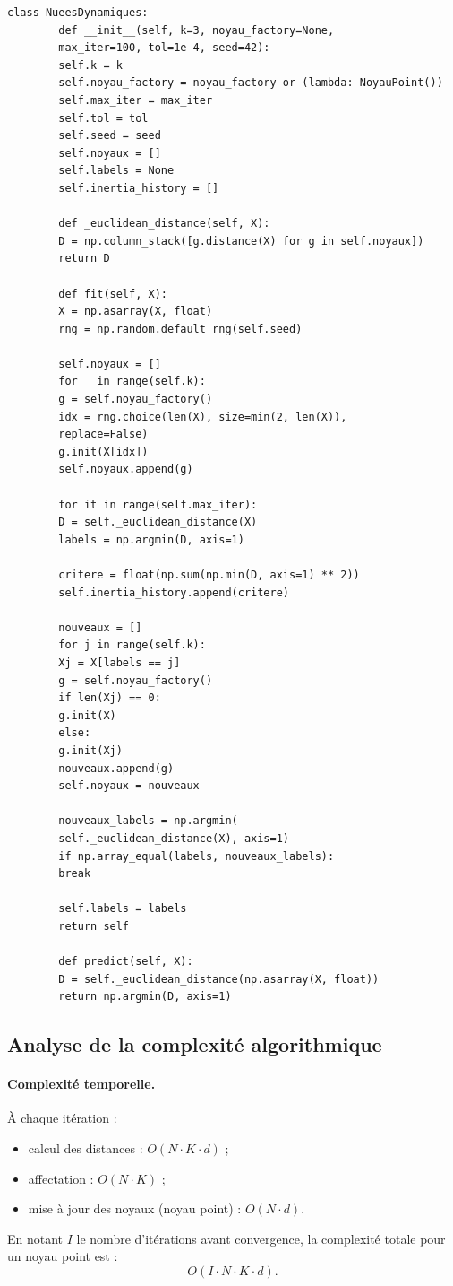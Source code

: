 \documentclass[a4paper, 11pt]{article}
\begin{document}
	\begin{lstlisting}[caption={Classe \texttt{NueesDynamiques}.}, label={lst:nuees}]
		class NueesDynamiques:
		def __init__(self, k=3, noyau_factory=None,
		max_iter=100, tol=1e-4, seed=42):
		self.k = k
		self.noyau_factory = noyau_factory or (lambda: NoyauPoint())
		self.max_iter = max_iter
		self.tol = tol
		self.seed = seed
		self.noyaux = []
		self.labels = None
		self.inertia_history = []
		
		def _euclidean_distance(self, X):
		D = np.column_stack([g.distance(X) for g in self.noyaux])
		return D
		
		def fit(self, X):
		X = np.asarray(X, float)
		rng = np.random.default_rng(self.seed)
		
		self.noyaux = []
		for _ in range(self.k):
		g = self.noyau_factory()
		idx = rng.choice(len(X), size=min(2, len(X)),
		replace=False)
		g.init(X[idx])
		self.noyaux.append(g)
		
		for it in range(self.max_iter):
		D = self._euclidean_distance(X)
		labels = np.argmin(D, axis=1)
		
		critere = float(np.sum(np.min(D, axis=1) ** 2))
		self.inertia_history.append(critere)
		
		nouveaux = []
		for j in range(self.k):
		Xj = X[labels == j]
		g = self.noyau_factory()
		if len(Xj) == 0:
		g.init(X)
		else:
		g.init(Xj)
		nouveaux.append(g)
		self.noyaux = nouveaux
		
		nouveaux_labels = np.argmin(
		self._euclidean_distance(X), axis=1)
		if np.array_equal(labels, nouveaux_labels):
		break
		
		self.labels = labels
		return self
		
		def predict(self, X):
		D = self._euclidean_distance(np.asarray(X, float))
		return np.argmin(D, axis=1)
	\end{lstlisting}
	
	\subsection{Analyse de la complexité algorithmique}
	
	\paragraph{Complexité temporelle.}
	À chaque itération :
	\begin{itemize}
		\item calcul des distances : \(O(N \cdot K \cdot d)\) ;
		\item affectation : \(O(N \cdot K)\) ;
		\item mise à jour des noyaux (noyau point) : \(O(N \cdot d)\).
	\end{itemize}
	En notant \(I\) le nombre d'itérations avant convergence, la
	complexité totale pour un noyau point est :
	\[
	O(I \cdot N \cdot K \cdot d).
	\]
	
\end{document}
